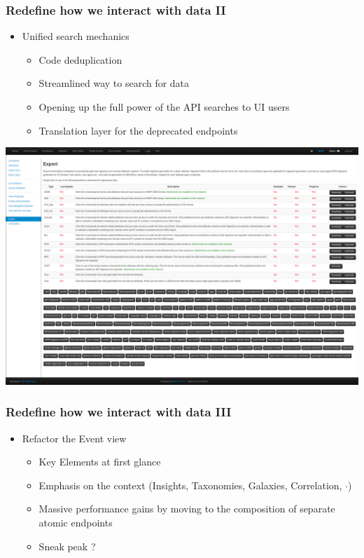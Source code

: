 \begin{frame}
    \frametitle{Redefine how we interact with data II}
    \begin{itemize}
        \item Unified search mechanics
        \begin{itemize}
            \item Code deduplication
            \item Streamlined way to search for data
            \item Opening up the full power of the API searches to UI users
            \item Translation layer for the deprecated endpoints
        \end{itemize}
    \end{itemize}
    \begin{center}
        \includegraphics[width=0.7\linewidth]{pictures/misp-export.png}
    \end{center}
\end{frame}

\begin{frame}
    \frametitle{Redefine how we interact with data III}
    \begin{itemize}
        \item Refactor the Event view
        \begin{itemize}
            \item Key Elements at first glance
            \item Emphasis on the context (Insights, Taxonomies, Galaxies, Correlation, $\cdot$)
            \item Massive performance gains by moving to the composition of separate atomic endpoints
            \item Sneak peak ? 
        \end{itemize}
    \end{itemize}
\end{frame}

